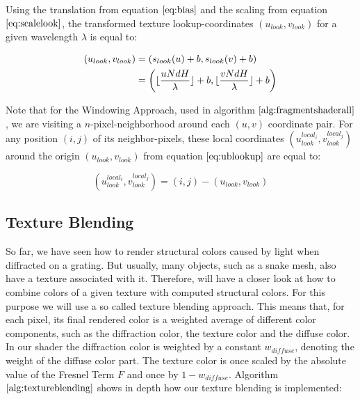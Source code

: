 Using the translation from equation $\ref{eq:bias}$ and the scaling from equation $\ref{eq:scalelook}$, the transformed texture lookup-coordinates $(u_{look}, v_{look})$ for a given wavelength $\lambda$ is equal to:

\begin{align}
  (u_{look}, v_{look}) 
  &= \left(s_{look}(u)+b,s_{look}(v)+b \right) \nonumber \\
  &= \left( \lfloor\frac{u N dH}{\lambda}\rfloor + b, \lfloor\frac{v N dH}{\lambda}\rfloor + b \right)
\label{eq:ublookup}
\end{align}  

Note that for the Windowing Approach, used in algorithm $\ref{alg:fragmentshaderall}$, we are visiting a $n$-pixel-neighborhood around each $(u,v)$ coordinate pair. For any position $(i,j)$ of its neighbor-pixels, these local coordinates $(u_{look}^{local_i}, v_{look}^{local_j})$ around the origin $(u_{look}, v_{look})$ from equation $\ref{eq:ublookup}$ are equal to:

\begin{equation}
  (u_{look}^{local_i}, v_{look}^{local_j}) = (i,j)-(u_{look}, v_{look})
\label{eq:gaussianwindowlook}
\end{equation}

\subsection{Texture Blending}
So far, we have seen how to render structural colors caused by light when diffracted on a grating. But usually, many objects, such as a snake mesh, also have a texture associated with it. Therefore, will have a closer look at how to combine colors of a given texture with computed structural colors. For this purpose we will use a so called texture blending approach. This means that, for each pixel, its final rendered color is a weighted average of different color components, such as the diffraction color, the texture color and the diffuse color. In our shader the diffraction color is weighted by a constant $w_{diffuse}$, denoting the weight of the diffuse color part. The texture color is once scaled by the absolute value of the Fresnel Term $F$ and once by $1-w_{diffuse}$. Algorithm $\ref{alg:textureblending}$ shows in depth how our texture blending is implemented:

